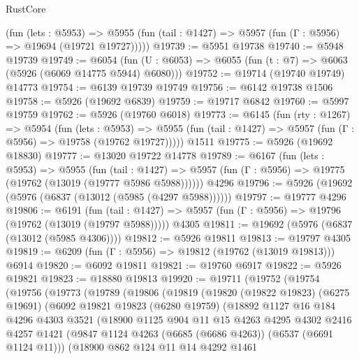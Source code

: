 \begin{lexlean}{RustCore}
\begin{coremodule}
      (fun (lets : @5953) =>
      @5955 (fun (tail : @1427) => @5957 (fun (Γ : @5956) => @19694 (@19721 @19727)))))
@19739 := @5951 @19738
@19740 := @5948 @19739
@19749 := @6054
    (fun (U : @6053) => @6055 (fun (t : @7) => @6063 (@5926 (@6069 @14775 @5944) @6080)))
@19752 := @19714 (@19740 @19749) @14773
@19754 := @6139 @19739 @19749
@19756 := @6142 @19738 @1506
@19758 := @5926 (@19692 @6839)
@19759 := @19717 @6842
@19760 := @5997 @19759
@19762 := @5926 (@19760 @6018)
@19773 := @6145
    (fun (rty : @1267) =>
    @5954
      (fun (lets : @5953) =>
      @5955 (fun (tail : @1427) => @5957 (fun (Γ : @5956) => @19758 (@19762 @19727)))))
    @1511
@19775 := @5926 (@19692 @18830)
@19777 := @13020 @19722 @14778
@19789 := @6167
    (fun (lets : @5953) =>
    @5955
      (fun (tail : @1427) =>
      @5957 (fun (Γ : @5956) => @19775 (@19762 (@13019 (@19777 @5986 @5988))))))
    @4296
@19796 := @5926 (@19692 (@5976 (@6837 (@13012 (@5985 (@4297 @5988))))))
@19797 := @19777 @4296
@19806 := @6191
    (fun (tail : @1427) => @5957 (fun (Γ : @5956) => @19796 (@19762 (@13019 (@19797 @5988)))))
    @4305
@19811 := @19692 (@5976 (@6837 (@13012 (@5985 @4306))))
@19812 := @5926 @19811
@19813 := @19797 @4305
@19819 := @6209 (fun (Γ : @5956) => @19812 (@19762 (@13019 @19813))) @6914
@19820 := @6092 @19811
@19821 := @19760 @6917
@19822 := @5926 @19821
@19823 := @18880 @19813
@19920 := @19711
    (@19752
      (@19754
        (@19756
          (@19773
            (@19789
              (@19806
                (@19819
                  (@19820
                    (@19822 @19823)
                    (@6275 @19691)
                    (@6092
                      @19821
                      @19823
                      (@6280 @19759)
                      (@18892
                        @1127
                        @16
                        @184
                        @4296
                        @4303
                        @3521
                        (@18900
                          @1125
                          @904
                          @11
                          @15
                          @4263
                          @4295
                          @4302
                          @2416
                          @4257
                          @1421
                          (@9847 @1124 @4263 (@6685 (@6686 @4263)) (@6537 (@6691 @1124 @11)))
                          (@18900
                            @862
                            @124
                            @11
                            @14
                            @4292
                            @1461

\end{coremodule}
\end{lexlean}
